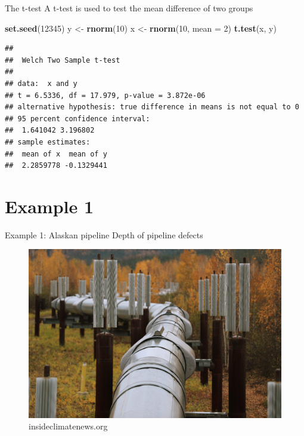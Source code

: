 \documentclass[
  ignorenonframetext,
]{beamer}
\newenvironment{Shaded}{\begin{snugshade}}{\end{snugshade}}
\newcommand{\AttributeTok}[1]{\textcolor[rgb]{0.13,0.29,0.53}{#1}}
\newcommand{\DecValTok}[1]{\textcolor[rgb]{0.00,0.00,0.81}{#1}}
\newcommand{\FunctionTok}[1]{\textcolor[rgb]{0.13,0.29,0.53}{\textbf{#1}}}
\newcommand{\NormalTok}[1]{#1}
\newcommand{\OtherTok}[1]{\textcolor[rgb]{0.56,0.35,0.01}{#1}}
\begin{document}
\begin{frame}[fragile]{The t-test}
\label{the-t-test}
A t-test is used to test the mean difference of two groups

\tiny

\begin{codebox}

\begin{Shaded}
\begin{Highlighting}[]
\FunctionTok{set.seed}\NormalTok{(}\DecValTok{12345}\NormalTok{)}
\NormalTok{y }\OtherTok{\textless{}{-}} \FunctionTok{rnorm}\NormalTok{(}\DecValTok{10}\NormalTok{)}
\NormalTok{x }\OtherTok{\textless{}{-}} \FunctionTok{rnorm}\NormalTok{(}\DecValTok{10}\NormalTok{, }\AttributeTok{mean =} \DecValTok{2}\NormalTok{)}
\FunctionTok{t.test}\NormalTok{(x, y)}
\end{Highlighting}
\end{Shaded}

\end{codebox}

\begin{codebox}

\begin{verbatim}
## 
##  Welch Two Sample t-test
## 
## data:  x and y
## t = 6.5336, df = 17.979, p-value = 3.872e-06
## alternative hypothesis: true difference in means is not equal to 0
## 95 percent confidence interval:
##  1.641042 3.196802
## sample estimates:
##  mean of x  mean of y 
##  2.2859778 -0.1329441
\end{verbatim}

\end{codebox}

\normalsize
\end{frame}

\section{Example 1}\label{example-1}

\begin{frame}{Example 1: Alaskan pipeline}
\label{example-1-alaskan-pipeline}
Depth of pipeline defects

\begin{figure}
\centering
\includegraphics{alaskapipeline.jpg}
\caption{insideclimatenews.org}
\end{figure}
\end{frame}
\end{document}
